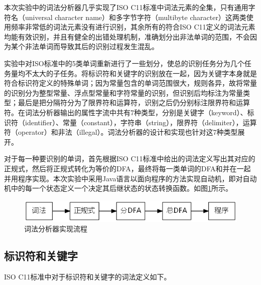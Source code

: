 \documentclass[UTF8, twoside, titlepage]{ctexart}
\begin{document}
本次实验中的词法分析器几乎实现了ISO C11标准中词法元素的全集，只有通用字符名（universal character name）和多字节字符（multibyte character）这两类使用频率非常低的词法元素没有进行识别，其余所有的符合ISO C11定义的词法元素均能有效识别，并且有健全的出错处理机制，准确划分出非法单词的范围，不会因为某个非法单词而导致其后的识别过程发生混乱。

实验中对ISO标准中的5类单词重新进行了一些划分，使总的识别任务分为几个任务量均不太大的子任务。将标识符和关键字的识别放在一起，因为关键字本身就是符合标识符定义的特殊单词；因为常量包含的单词范围很大，规则各异，故将常量的识别分为整型常量、浮点型常量和字符常量的识别，但识别后均标注为常量类型；最后是把分隔符分为了限界符和运算符，识别之后仍分别标注限界符和运算符。在词法分析器输出的属性字流中共有7种类型，分别是关键字（keyword）、标识符（identifier）、常量（constant），字符串（string），限界符（delimiter），运算符（operator）和非法（illegal）。词法分析器的设计和实现也针对这7种类型展开。

对于每一种要识别的单词，首先根据ISO C11标准中给出的词法定义写出其对应的正规式，然后将正规式转化为等价的DFA，最终将每一类单词的DFA和并在一起并用程序实现。本次实验中采用Java语言以面向程序的方法实现自动机，即对自动机中的每一个状态定义一个决定其后继状态的状态转换函数。如图\ref{fig:flow}所示。

\begin{figure}[htbp]
	\centering
	\includegraphics[width=12cm]{images/flow.png}
	\caption{词法分析器实现流程}
	\label{fig:flow}
\end{figure}

\subsection{标识符和关键字}
ISO C11标准中对于标识符和关键字的词法定义如下。
\end{document}
